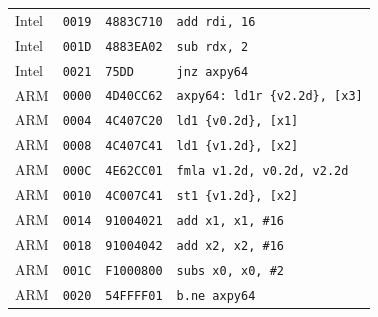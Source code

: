 \begin{table}[htbp]
\begin{tabular}{@{}l|l|l|p{7.2cm}@{}}
Intel & \texttt{0019} & \texttt{4883C710} & \texttt{add rdi, 16} \\
Intel & \texttt{001D} & \texttt{4883EA02} & \texttt{sub rdx, 2} \\
Intel & \texttt{0021} & \texttt{75DD} & \texttt{jnz axpy64} \\
\midrule
ARM & \texttt{0000} & \texttt{4D40CC62} & \texttt{axpy64: ld1r \{v2.2d\}, [x3]} \\
ARM & \texttt{0004} & \texttt{4C407C20} & \texttt{ld1 \{v0.2d\}, [x1]} \\
ARM & \texttt{0008} & \texttt{4C407C41} & \texttt{ld1 \{v1.2d\}, [x2]} \\
ARM & \texttt{000C} & \texttt{4E62CC01} & \texttt{fmla v1.2d, v0.2d, v2.2d} \\
ARM & \texttt{0010} & \texttt{4C007C41} & \texttt{st1 \{v1.2d\}, [x2]} \\
ARM & \texttt{0014} & \texttt{91004021} & \texttt{add x1, x1, \#16} \\
ARM & \texttt{0018} & \texttt{91004042} & \texttt{add x2, x2, \#16} \\
ARM & \texttt{001C} & \texttt{F1000800} & \texttt{subs x0, x0, \#2} \\
ARM & \texttt{0020} & \texttt{54FFFF01} & \texttt{b.ne axpy64} \\
\bottomrule
\end{tabular}
\endgroup
\end{table}
\noindent{}\par
